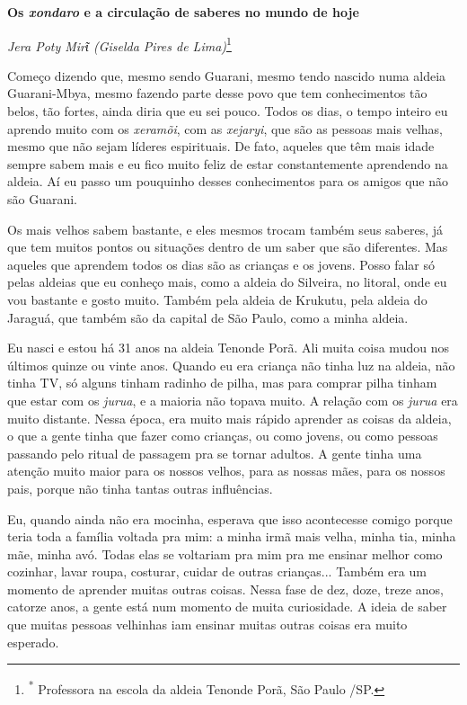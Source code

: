 \textbf{Os \emph{xondaro} e a circulação de saberes no mundo de hoje}

\emph{Jera Poty Mirῖ (Giselda Pires de Lima)}\footnote{\textsuperscript{*}
  Professora na escola da aldeia Tenonde Porã, São Paulo /SP.}\emph{\textbf{\\
}}

Começo dizendo que, mesmo sendo Guarani, mesmo tendo nascido numa aldeia
Guarani-Mbya, mesmo fazendo parte desse povo que tem conhecimentos tão
belos, tão fortes, ainda diria que eu sei pouco. Todos os dias, o tempo
inteiro eu aprendo muito com os \emph{xeramõi}, com as \emph{xejaryi},
que são as pessoas mais velhas, mesmo que não sejam líderes espirituais.
De fato, aqueles que têm mais idade sempre sabem mais e eu fico muito
feliz de estar constantemente aprendendo na aldeia. Aí eu passo um
pouquinho desses conhecimentos para os amigos que não são Guarani.

Os mais velhos sabem bastante, e eles mesmos trocam também seus saberes,
já que tem muitos pontos ou situações dentro de um saber que são
diferentes. Mas aqueles que aprendem todos os dias são as crianças e os
jovens. Posso falar só pelas aldeias que eu conheço mais, como a aldeia
do Silveira, no litoral, onde eu vou bastante e gosto muito. Também pela
aldeia de Krukutu, pela aldeia do Jaraguá, que também são da capital de
São Paulo, como a minha aldeia.

Eu nasci e estou há 31 anos na aldeia Tenonde Porã. Ali muita coisa
mudou nos últimos quinze ou vinte anos. Quando eu era criança não tinha
luz na aldeia, não tinha TV, só alguns tinham radinho de pilha, mas para
comprar pilha tinham que estar com os \emph{jurua}, e a maioria não
topava muito. A relação com os \emph{jurua} era muito distante. Nessa
época, era muito mais rápido aprender as coisas da aldeia, o que a gente
tinha que fazer como crianças, ou como jovens, ou como pessoas passando
pelo ritual de passagem pra se tornar adultos. A gente tinha uma atenção
muito maior para os nossos velhos, para as nossas mães, para os nossos
pais, porque não tinha tantas outras influências.

Eu, quando ainda não era mocinha, esperava que isso acontecesse comigo
porque teria toda a família voltada pra mim: a minha irmã mais velha,
minha tia, minha mãe, minha avó. Todas elas se voltariam pra mim pra me
ensinar melhor como cozinhar, lavar roupa, costurar, cuidar de outras
crianças... Também era um momento de aprender muitas outras coisas.
Nessa fase de dez, doze, treze anos, catorze anos, a gente está num
momento de muita curiosidade. A ideia de saber que muitas pessoas
velhinhas iam ensinar muitas outras coisas era muito esperado.

